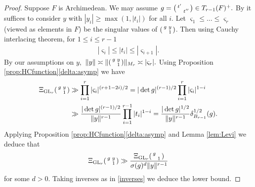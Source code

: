 \documentclass[12pt]{amsart}
\theoremstyle{remark}
\numberwithin{equation}{section}
\newcommand{\GL}{\mathrm{GL}}
\theoremstyle{definition}
\newenvironment{psmatrix}
  {\left(\begin{smallmatrix}}
  {\end{smallmatrix}\right)}
\numberwithin{equation}{subsection}
\newcommand{\norm}[1]{\lVert#1\rVert}
\begin{document}
\begin{proof}
Suppose $F$ is Archimedean. We may assume $g=\begin{psmatrix}t'& \\ &t''\end{psmatrix}\in T_{r-1}(F)^+.$  By \cite[Part II, Proposition 8.16(v)]{Varadarajan} it suffices to consider $y$ with  $|y_i|\ge \max(1,|t_i|)$ for all $i$. Let $\varsigma_1\le \ldots\le \varsigma_r$ (viewed as elements in $F$) be the singular values of $\begin{psmatrix}
    g & y\\
    & 1
\end{psmatrix}$. Then using Cauchy interlacing theorem, for $1\le i\le r-1$
\begin{align*}
    |\varsigma_i|\le |t_i|\le |\varsigma_{i+1}|.
\end{align*}
By our assumptions on $y,$ 
$\norm{y}\asymp \norm{\begin{psmatrix}g & y \\ & 1 \end{psmatrix}}_{M_r} \asymp |\varsigma_r|.$ Using Proposition \ref{prop:HCfunction}\ref{delta:asymp} we have
\begin{align*}
    \Xi_{\GL_{r}}\begin{psmatrix}
    g & y\\
    & 1
\end{psmatrix}&\gg \prod_{i=1}^{r} |\varsigma_i|^{(r+1-2i)/2}=|\det g|^{(r-1)/2} \prod_{i=1}^{r} |\varsigma_i|^{1-i}\\
&\gg\frac{|\det g|^{(r-1)/2} }{\norm{y}^{r-1}}\prod_{i=1}^{r-1} |t_i|^{1-i}=\frac{|\det g|^{1/2}}{\norm{y}^{r-1}} \delta_{B_{r-1}}^{1/2}(g).
\end{align*}
Applying Proposition \ref{prop:HCfunction}\ref{delta:asymp} and Lemma \ref{lem:Levi} we deduce that 
$$
\Xi_{\GL_r}\begin{psmatrix} g & y \\ & 1 \end{psmatrix} \gg \frac{\Xi_{\GL_r}\begin{psmatrix} g & \\ & 1 \end{psmatrix}}{\sigma(g)^{d}\norm{y}^{r-1}}
$$
for some $d>0$.  Taking inverses as in \eqref{inverses} we deduce the lower bound.



\end{proof}
\end{document}
